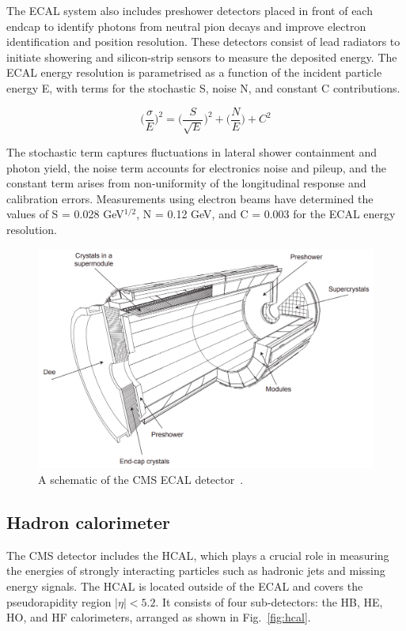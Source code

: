 The \ac{ECAL} system also includes preshower detectors placed in front of each endcap to identify photons from neutral pion decays and improve electron identification and position resolution. 
These detectors consist of lead radiators to initiate showering and silicon-strip sensors to measure the deposited energy. 
The \ac{ECAL} energy resolution is parametrised as a function of the incident particle energy E, with terms for the stochastic S, noise N, and constant C contributions.

\begin{equation}
\Big(\frac{\sigma}{E}\Big)^2 = \Big(\frac{S}{\sqrt{E}}\Big)^2 + \Big( \frac{N}{E} \Big) + C^2
\end{equation}

The stochastic term captures fluctuations in lateral shower containment and photon yield, the noise term accounts for electronics noise and pileup, and the constant term arises from non-uniformity of the longitudinal response and calibration errors. 
Measurements using electron beams have determined the values of S = 0.028 GeV$^{1/2}$, N = 0.12 GeV, and C = 0.003 for the ECAL energy resolution.

\begin{figure}[!hbtp]
    \centering
    \includegraphics[width=\textwidth]{Figures/ECAL.png}
    \caption{A schematic of the CMS ECAL detector~\cite{CMS_Setup}.}
    \label{fig:ecal}
\end{figure}

\subsection{Hadron calorimeter}

The \ac{CMS} detector includes the \ac{HCAL}, which plays a crucial role in measuring the energies of strongly interacting particles such as hadronic jets and missing energy signals. 
The \ac{HCAL} is located outside of the \ac{ECAL} and covers the pseudorapidity region $|\eta| < 5.2$. 
It consists of four sub-detectors: the \ac{HB}, \ac{HE}, \ac{HO}, and \ac{HF} calorimeters, arranged as shown in Fig.~\ref{fig:hcal}.

